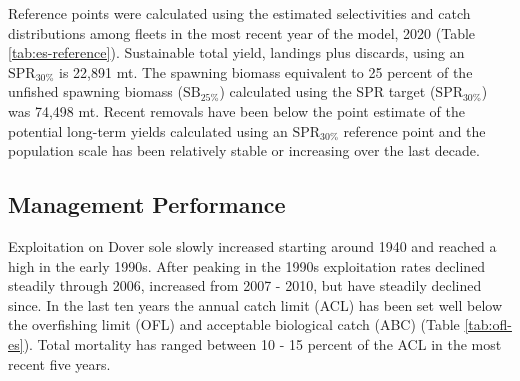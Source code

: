 \documentclass[11pt,
  english,
  a4paper,
]{article}
\begin{document}

Reference points were calculated using the estimated selectivities and catch distributions among fleets in the most recent year of the model, 2020 (Table \ref{tab:es-reference}). Sustainable total yield, landings plus discards, using an {\(\text{SPR}_{30\%}\)\leavevmode\tagmcend\tagstructend} is 22,891 mt. The spawning biomass equivalent to 25 percent of the unfished spawning biomass ({\(\text{SB}_{25\%}\)\leavevmode\tagmcend\tagstructend}) calculated using the SPR target ({\(\text{SPR}_{30\%}\)\leavevmode\tagmcend\tagstructend}) was 74,498 mt. Recent removals have been below the point estimate of the potential long-term yields calculated using an {\(\text{SPR}_{30\%}\)\leavevmode\tagmcend\tagstructend} reference point and the population scale has been relatively stable or increasing over the last decade.

\leavevmode\tagmcend\tagstructend\par



\clearpage


\hypertarget{management-performance}{%
\subsection*{Management Performance}\label{management-performance}}

\leavevmode\tagmcend\tagstructend


Exploitation on Dover sole slowly increased starting around 1940 and reached a high in the early 1990s. After peaking in the 1990s exploitation rates declined steadily through 2006, increased from 2007 - 2010, but have steadily declined since. In the last ten years the annual catch limit (ACL) has been set well below the overfishing limit (OFL) and acceptable biological catch (ABC) (Table \ref{tab:ofl-es}). Total mortality has ranged between 10 - 15 percent of the ACL in the most recent five years.

\leavevmode\tagmcend\tagstructend\par
\end{document}
